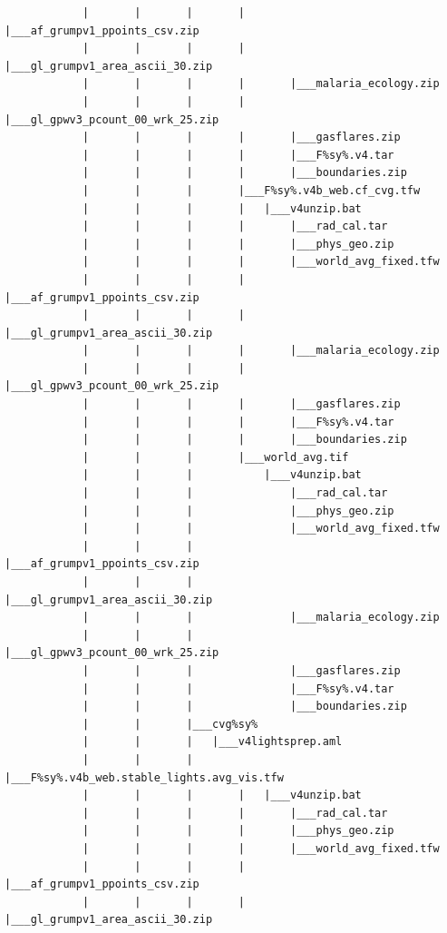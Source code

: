 \documentclass[
]{book}
\begin{document}
\begin{verbatim}
            |       |       |       |       |___af_grumpv1_ppoints_csv.zip
            |       |       |       |       |___gl_grumpv1_area_ascii_30.zip
            |       |       |       |       |___malaria_ecology.zip
            |       |       |       |       |___gl_gpwv3_pcount_00_wrk_25.zip
            |       |       |       |       |___gasflares.zip
            |       |       |       |       |___F%sy%.v4.tar
            |       |       |       |       |___boundaries.zip
            |       |       |       |___F%sy%.v4b_web.cf_cvg.tfw
            |       |       |       |   |___v4unzip.bat
            |       |       |       |       |___rad_cal.tar
            |       |       |       |       |___phys_geo.zip
            |       |       |       |       |___world_avg_fixed.tfw
            |       |       |       |       |___af_grumpv1_ppoints_csv.zip
            |       |       |       |       |___gl_grumpv1_area_ascii_30.zip
            |       |       |       |       |___malaria_ecology.zip
            |       |       |       |       |___gl_gpwv3_pcount_00_wrk_25.zip
            |       |       |       |       |___gasflares.zip
            |       |       |       |       |___F%sy%.v4.tar
            |       |       |       |       |___boundaries.zip
            |       |       |       |___world_avg.tif
            |       |       |           |___v4unzip.bat
            |       |       |               |___rad_cal.tar
            |       |       |               |___phys_geo.zip
            |       |       |               |___world_avg_fixed.tfw
            |       |       |               |___af_grumpv1_ppoints_csv.zip
            |       |       |               |___gl_grumpv1_area_ascii_30.zip
            |       |       |               |___malaria_ecology.zip
            |       |       |               |___gl_gpwv3_pcount_00_wrk_25.zip
            |       |       |               |___gasflares.zip
            |       |       |               |___F%sy%.v4.tar
            |       |       |               |___boundaries.zip
            |       |       |___cvg%sy%
            |       |       |   |___v4lightsprep.aml
            |       |       |       |___F%sy%.v4b_web.stable_lights.avg_vis.tfw
            |       |       |       |   |___v4unzip.bat
            |       |       |       |       |___rad_cal.tar
            |       |       |       |       |___phys_geo.zip
            |       |       |       |       |___world_avg_fixed.tfw
            |       |       |       |       |___af_grumpv1_ppoints_csv.zip
            |       |       |       |       |___gl_grumpv1_area_ascii_30.zip

\end{verbatim}
\end{document}
